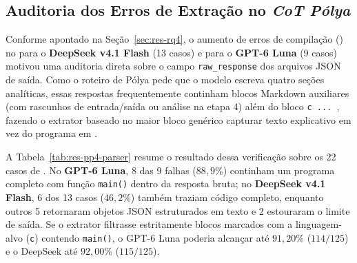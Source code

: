 \subsection{Auditoria dos Erros de Extração no \textit{CoT Pólya}}\label{sec:res-rq4-parser}

Conforme apontado na Seção~\ref{sec:res-rq4}, o aumento de erros de compilação () no  para o \textbf{DeepSeek v4.1 Flash} (13 casos) e para o \textbf{GPT-6 Luna} (9 casos) motivou uma auditoria direta sobre o campo \texttt{raw\_response} dos arquivos JSON de saída. Como o roteiro de Pólya pede que o modelo escreva quatro seções analíticas, essas respostas frequentemente continham blocos Markdown auxiliares (com rascunhos de entrada/saída ou análise na etapa 4) além do bloco \texttt{\textasciigrave\textasciigrave\textasciigrave c ... \textasciigrave\textasciigrave\textasciigrave}, fazendo o extrator baseado no maior bloco genérico capturar texto explicativo em vez do programa em .

A Tabela~\ref{tab:res-pp4-parser} resume o resultado dessa verificação sobre os 22 casos de . No \textbf{GPT-6 Luna}, 8 das 9 falhas ($88{,}9\%$) continham um programa  completo com função \texttt{main()} dentro da resposta bruta; no \textbf{DeepSeek v4.1 Flash}, 6 dos 13 casos ($46{,}2\%$) também traziam código  completo, enquanto outros 5 retornaram objetos JSON estruturados em texto e 2 estouraram o limite de saída. Se o extrator filtrasse estritamente blocos marcados com a linguagem-alvo (\texttt{\textasciigrave\textasciigrave\textasciigrave c}) contendo \texttt{main()}, o GPT-6 Luna poderia alcançar até $91{,}20\%$ ($114/125$) e o DeepSeek até $92{,}00\%$ ($115/125$).

